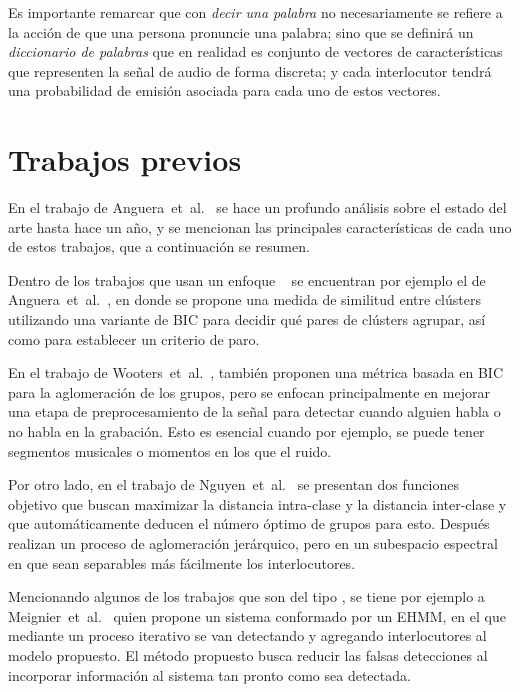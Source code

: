 Es importante remarcar que con \textit{decir una palabra} no necesariamente se refiere a la acción de que una persona pronuncie una palabra; sino que se definirá un \textit{diccionario de palabras} que en realidad es conjunto de vectores de características que representen la señal de audio de forma discreta; y cada interlocutor tendrá una probabilidad de emisión asociada para cada uno de estos vectores.

\section{Trabajos previos}

En el trabajo de Anguera~et~al.~\cite{AngueraMiro2012} se hace un profundo análisis sobre el estado del arte hasta hace un año, y se mencionan las principales características de cada uno de estos trabajos, que a continuación se resumen.

Dentro de los trabajos que usan un enfoque \bu~ se encuentran por ejemplo el de Anguera~et~al.~\cite{AngueraMiro2006}, en donde se propone una medida de similitud entre clústers utilizando una variante de \ac{BIC} para decidir qué pares de clústers agrupar, así como para establecer un criterio de paro.

En el trabajo de Wooters~et~al.~\cite{Wooters2007}, también proponen una métrica basada en \ac{BIC} para la aglomeración de los grupos, pero se enfocan principalmente en mejorar una etapa de preprocesamiento de la señal para detectar cuando alguien habla o no habla en la grabación. Esto es esencial cuando por ejemplo, se puede tener segmentos musicales o momentos en los que el ruido.

Por otro lado, en el trabajo de Nguyen~et~al.~\cite{Nguyen2009} se presentan dos funciones objetivo que buscan maximizar la distancia intra-clase y la distancia inter-clase y que automáticamente deducen el número óptimo de grupos para esto. Después realizan un proceso de aglomeración jerárquico, pero en un subespacio espectral en que sean separables más fácilmente los interlocutores.

Mencionando algunos de los trabajos que son del tipo \td, se tiene por ejemplo a Meignier~et~al.~\cite{Meignier2001} quien propone un sistema conformado por un \ac{EHMM}, en el que mediante un proceso iterativo se van detectando y agregando interlocutores al modelo propuesto. El método propuesto busca reducir las falsas detecciones al incorporar información al sistema tan pronto 
como sea detectada. 

